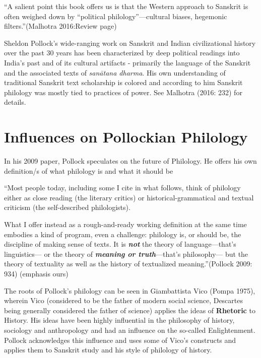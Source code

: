 \begin{myquote}
“A salient point this book offers us is that the Western approach to Sanskrit is often weighed down by “political philology”—cultural biases, hegemonic filters.”\hfill (Malhotra 2016:Review page)
\end{myquote}

Sheldon Pollock’s wide-ranging work on Sanskrit and Indian civilizational history over the past 30 years has been characterized by deep political readings into India’s past and of its cultural artifacts - primarily the language of the Sanskrit and the associated texts of \textit{sanātana dharma}. His own understanding of traditional Sanskrit text scholarship is colored and according to him Sanskrit philology was mostly tied to practices of power. See Malhotra (2016: 232) for details.


\section*{Influences on Pollockian Philology}

In his 2009 paper, Pollock speculates on the future of Philology. He offers his own definition/s of what philology is and what it should be

\begin{myquote}
“Most people today, including some I cite in what follows, think of philology either as close reading (the literary critics) or historical-grammatical and textual criticism (the self-described philologists).
\end{myquote}

\begin{myquote}
What I offer instead as a rough-and-ready working definition at the same time embodies a kind of program, even a challenge: philology is, or should be, the discipline of making sense of texts. It is \textbf{\textit{not}} the theory of language—that’s linguistics— or the theory of \textbf{\textit{meaning or truth}}—that’s philosophy— but the theory of textuality as well as the history of textualized meaning.”\hfill (Pollock 2009: 934) (emphasis ours)
\end{myquote}

The roots of Pollock’s philology can be seen in Giambattista Vico (Pompa 1975), wherein Vico (considered to be the father of modern social science, Descartes being generally considered the father of science) applies the ideas of \textbf{Rhetoric} to History. His ideas have been highly influential in the philosophy of history, sociology and anthropology and had an influence on the so-called Enlightenment. Pollock acknowledges this influence and uses some of Vico’s constructs and applies them to Sanskrit study and his style of philology of history.


